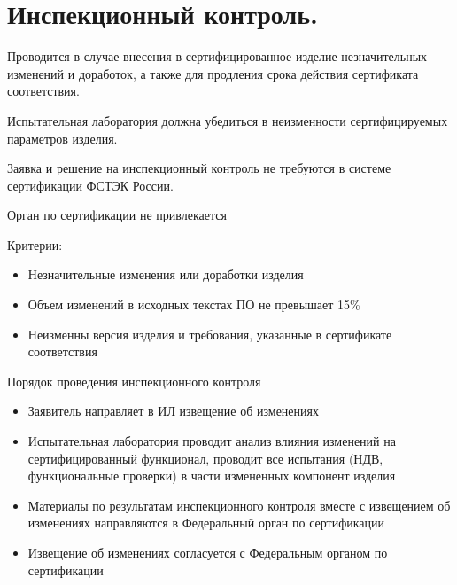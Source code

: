 \section{Инспекционный контроль.}

Проводится в случае внесения в сертифицированное изделие незначительных изменений и доработок, а также для продления срока действия сертификата соответствия.

Испытательная лаборатория должна убедиться в неизменности сертифицируемых параметров изделия.

Заявка и решение на инспекционный контроль не требуются в системе сертификации ФСТЭК России.

Орган по сертификации не привлекается

Критерии:
\begin{itemize}
	\item Незначительные изменения или доработки изделия
	\item Объем изменений в исходных текстах ПО не превышает 15\%
	\item Неизменны версия изделия и требования, указанные в сертификате соответствия
\end{itemize}

 Порядок проведения инспекционного контроля
 \begin{itemize}
 	\item Заявитель направляет в ИЛ извещение об изменениях
 	\item Испытательная лаборатория проводит анализ влияния изменений на сертифицированный функционал, проводит все испытания (НДВ, функциональные проверки) в части измененных компонент изделия
 	\item Материалы по результатам инспекционного контроля вместе с извещением об изменениях направляются в Федеральный орган по сертификации
 	\item Извещение об изменениях согласуется с Федеральным органом по сертификации
 \end{itemize}